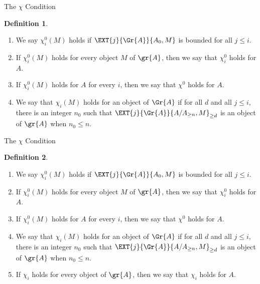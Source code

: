 \documentclass{beamer}
\theoremstyle{definition}
\newtheorem{defn}{Definition}
\begin{document}
\begin{frame}{The $\chi$ Condition}
  \setcounter{defn}{6}
  \begin{defn}
    \begin{enumerate}
    \item
      We say $\chi_i^0(M)$ holds if $\EXT{j}{\Gr{A}}{A_0, M}$ is bounded for all $j \leq i$.
    \item
      If $\chi^0_i(M)$ holds for every object $M$ of $\gr{A}$, then we say that $\chi^0_i$ holds for $A$.
    \item
      If $\chi^0_i(M)$ holds for $A$ for every $i$, then we say that $\chi^0$ holds for $A$.
    \item
      We say that $\chi_i(M)$ holds for an object of $\Gr{A}$ if for all $d$ and all $j \leq i$, there is an integer $n_0$ such that $\EXT{j}{\Gr{A}}{A/A_{\geq n}, M}_{\geq d}$ is an object of $\gr{A}$ when $n_0 \leq n$.
    \end{enumerate}
  \end{defn}
\end{frame}

\begin{frame}{The $\chi$ Condition}
  \setcounter{defn}{6}
  \begin{defn}
    \begin{enumerate}
    \item
      We say $\chi_i^0(M)$ holds if $\EXT{j}{\Gr{A}}{A_0, M}$ is bounded for all $j \leq i$.
    \item
      If $\chi^0_i(M)$ holds for every object $M$ of $\gr{A}$, then we say that $\chi^0_i$ holds for $A$.
    \item
      If $\chi^0_i(M)$ holds for $A$ for every $i$, then we say that $\chi^0$ holds for $A$.
    \item
      We say that $\chi_i(M)$ holds for an object of $\Gr{A}$ if for all $d$ and all $j \leq i$, there is an integer $n_0$ such that $\EXT{j}{\Gr{A}}{A/A_{\geq n}, M}_{\geq d}$ is an object of $\gr{A}$ when $n_0 \leq n$.
    \item
      If $\chi_i$ holds for every object of $\gr{A}$, then we say that $\chi_i$ holds for $A$.
    \end{enumerate}
  \end{defn}
\end{frame}
\end{document}

